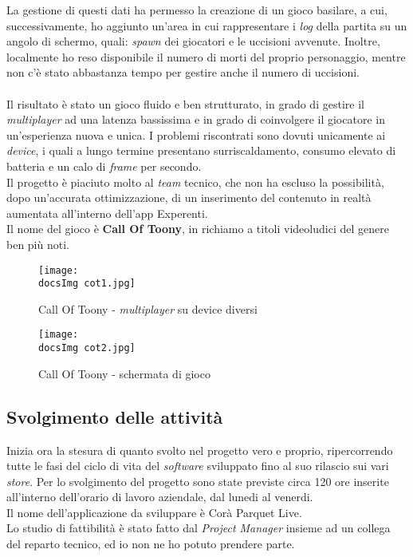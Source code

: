 La gestione di questi dati ha permesso la creazione di un gioco basilare, a cui, successivamente, ho aggiunto un'area in cui rappresentare i \textit{log} della partita su un angolo di schermo, quali: \textit{spawn} dei giocatori e le uccisioni avvenute. Inoltre, localmente ho reso disponibile il numero di morti del proprio personaggio, mentre non c'\`e stato abbastanza tempo per gestire anche il numero di uccisioni.\\\\
Il risultato \`e stato un gioco fluido e ben strutturato, in grado di gestire il \textit{multiplayer} ad una latenza bassissima e in grado di coinvolgere il giocatore in un'esperienza nuova e unica. I problemi riscontrati sono dovuti unicamente ai \textit{device}, i quali a lungo termine presentano surriscaldamento, consumo elevato di batteria e un calo di \textit{frame} per secondo.\\
Il progetto \`e piaciuto molto al \textit{team} tecnico, che non ha escluso la possibilit\`a, dopo un'accurata ottimizzazione, di un inserimento del contenuto in realt\`a aumentata all'interno dell'app Experenti.\\
Il nome del gioco \`e \textbf{Call Of Toony}, in richiamo a titoli videoludici del genere ben pi\`u noti.

\begin{figure}[H]
	\centering
	\texttt{[image: \\docsImg cot1.jpg]}
	\caption{Call Of Toony - \textit{multiplayer} su device diversi}
	\label{fig:Call Of Toony - multiplayer}
\end{figure}

\begin{figure}[H]
	\centering
	\texttt{[image: \\docsImg cot2.jpg]}
	\caption{Call Of Toony - schermata di gioco}
	\label{fig:Call Of Toony - schermata di gioco}
\end{figure}

\subsection{Svolgimento delle attivit\`a}
Inizia ora la stesura di quanto svolto nel progetto vero e proprio, ripercorrendo tutte le fasi del ciclo di vita del \textit{software\gloss} sviluppato fino al suo rilascio sui vari \textit{store}. Per lo svolgimento del progetto sono state previste circa 120 ore inserite all'interno dell'orario di lavoro aziendale, dal lunedi al venerdi.\\
Il nome dell'applicazione da sviluppare \`e Cor\`a Parquet Live.\\
Lo studio di fattibilit\`a \`e stato fatto dal \textit{Project Manager} insieme ad un collega del reparto tecnico, ed io non ne ho potuto prendere parte.

